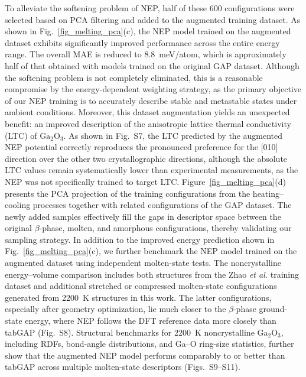 \documentclass[aip,graphicx,amsmath,amssymb]{revtex4-1}
\newcommand{\ga}{$\text{Ga}_2\text{O}_3$}
\begin{document}
To alleviate the softening problem of NEP, half of these 600 configurations were selected
based on PCA filtering\cite{chen_neptrain_2025} and added to the augmented training dataset.
As shown in Fig.~\ref{fig_melting_pca}(c), the NEP model trained on the augmented dataset
exhibits significantly improved performance across the entire energy range.
The overall MAE is reduced to 8.8~meV/atom, which is approximately half of that obtained with
models trained on the original GAP dataset.
Although the softening problem is not completely eliminated, this is a reasonable compromise 
by the energy-dependent weighting strategy, as the primary objective of our NEP training is 
to accurately describe stable and metastable states under ambient conditions.
Moreover, this dataset augmentation yields an unexpected benefit: 
an improved description of the anisotropic lattice thermal conductivity (LTC) of \ga. 
As shown in Fig.~S7, the LTC predicted by the augmented NEP potential correctly reproduces the 
pronounced preference for the [010] direction over the other two crystallographic directions, 
although the absolute LTC values remain systematically lower than experimental measurements, 
as the NEP was not specifically trained to target LTC.
Figure~\ref{fig_melting_pca}(d) presents the PCA projection of the training configurations
from the heating--cooling processes together with related configurations of the GAP
dataset.
The newly added samples effectively fill the gaps in descriptor space between the original
$\beta$-phase, molten, and amorphous configurations, thereby validating our sampling strategy.
In addition to the improved energy prediction shown in Fig.~\ref{fig_melting_pca}(c), we further
benchmark the NEP model trained on the augmented dataset using independent molten-state tests.
The noncrystalline energy--volume comparison includes both structures from the Zhao \textit{et al.}
training dataset and additional stretched or compressed molten-state configurations generated from
2200~K structures in this work.
The latter configurations, especially after geometry optimization, lie much closer to the
$\beta$-phase ground-state energy, where NEP follows the DFT reference data more closely than
tabGAP (Fig.~S8).
Structural benchmarks for 2200~K noncrystalline Ga$_2$O$_3$, including RDFs, bond-angle
distributions, and Ga--O ring-size statistics, further show that the augmented NEP model performs
comparably to or better than tabGAP across multiple molten-state descriptors (Figs.~S9--S11).
\end{document}
